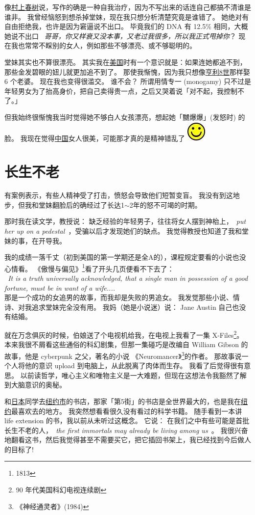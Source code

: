\documentclass[12pt]{report}
\newcommand{\speechEn}[1]{\textrm{\textit{\ #1\ }}}
\newcommand{\speechCn}[1]{\textrm{\textit{\textcolor{Speech}{#1}}}}
\newcommand*\smiley{\includegraphics[scale=0.5]{smiley.jpg}}
\begin{document}
像\uline{村上春树}说，写作的确是一种自我治疗，因为不写出来的话连自己都搞不清谁是谁非。 我曾经恼怒到想杀掉堂妹，现在我只想分析清楚究竟是谁错了。 她绝对有自由拒绝我，也许是因为窘逼说不出口。 毕竟我们的 DNA 有 12.5\% 相同，大概她说不出口 \ \speechCn{哥哥，你又样衰又没本事，又老过我很多，所以我正式甩掉你}？ 现在我也常常不睬别的女人，例如那些不够漂亮、或不够聪明的。

堂妹其实也不算很漂亮。 其实我在\uline{美国}时有一个意识就是：如果连她都追不到，那些金发碧眼的妞儿就更加追不到了。 那使我惭愧，因为我只想像\uline{亨利8世}那样娶 6 个老婆。 现在我也变得很滥交。 谁不会？  所谓用情专一 (monogamy) 只不过是年轻男女为了抬高身价，把自己卖得贵一点，之后又哭着说「对不起，我控制不了。」

但我始终很惭愧我当时觉得她不够白人女孩漂亮，想起她「嬲爆爆」(发怒时) 的脸。 我现在觉得\uline{中国}女人很美，可能那才真的是精神错乱了 \smiley

\chapter{长生不老}

有案例表示，有些人精神受了打击，愤怒会导致他们短暂变盲。 我没有到这地步，但我和堂妹翻脸后的确经过了长达1$\sim$2年的怒不可竭的时期。

那时我在读文学，教授说： 缺乏经验的年轻男子，往往将女人摆到神枱上，\speechEn{put her up on a pedestal}，受骗以后才发现她们的缺点。  我觉得教授也知道了我和堂妹的事，在开导我。

我的成绩一落千丈（初到美国的第一学期还是全A的），课程规定要看的小说也没心情看。 《傲慢与偏见》\footnote{1813}看了开头几页便看不下去了： \\
\speechEn{It is a truth universally acknowledged, that a single man in possession of a good fortune, must be in want of a wife....} \\
那是一个成功的女追男的故事，而我却是失败的男追女。 我发觉那些小说、情诗、对我追求堂妹完全没有用。 我妈（她是小说迷）说： Jane Austin 自己也没有结婚。

就在万念俱灰的时候，伯娘送了个电视机给我，在电视上我看了一集 X-Files\footnote{90 年代美国科幻电视连续剧}。 本来我很不屑看这些通俗的科幻剧集，但那一集碰巧是改编自 William Gibson 的故事，他是 cyberpunk 之父，著名的小说 《Neuromancer》\footnote{《神经通灵者》(1984)}的作者。 那故事说一个人将他的意识 upload 到电脑上，从此脱离了肉体而生存。 我看了后觉得很有意思。 以前读哲学，唯心主义和唯物主义是一大难题，但现在这想法令我豁然了解到大脑意识的奥秘。 

和\uline{日本}同学去\uline{纽约市}的书店，那家「第5街」的书店是全世界最大的，也是我在\uline{纽约}最喜欢去的地方。 我突然想看看很久没有看过的科学书籍。 随手看到一本讲 life extension 的书，我以前从未听过这概念。 它说： 在我们之中有些可能是首批长生不老的人，\speechEn{the first immortals may already be living among us}。 我很兴奋地翻看这书，然后我觉得甚至不需要买它，把它插回书架上，我已经找到今后做人的目标了!
\end{document}
